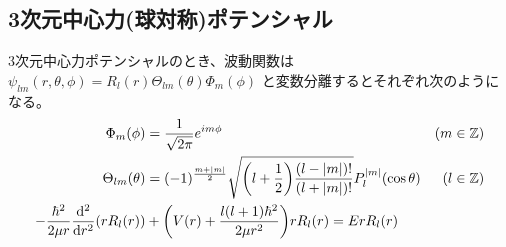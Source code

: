 \documentclass[uplatex,dvipdfmx,a4paper,11pt]{jlreq}
\newcommand{\ZZ}{\mathbb{Z}}
\numberwithin{equation}{section}
\theoremstyle{definition}
\begin{document}
\subsection{3次元中心力(球対称)ポテンシャル}
\begin{proposition}
  3次元中心力ポテンシャルのとき、波動関数は $\psi_{lm}(r, \theta, \phi) = R_l(r)\Theta_{lm}(\theta)\Phi_m(\phi)$ と変数分離するとそれぞれ次のようになる。
  \begin{align}
    \Phi_m(\phi)                               & = \frac{1}{\sqrt{2\pi}}e^{im\phi}                                                                        & (m\in\ZZ) \\
    \Theta_{lm}(\theta)                        & = (-1)^{\frac{m + |m|}{2}}\sqrt{\qty(l + \frac{1}{2})\frac{(l - |m|)!}{(l + |m|)!}}P_l^{|m|}(\cos\theta) & (l\in\ZZ) \\
    - \frac{\hbar^2}{2\mu r}\dv[2]{r}(rR_l(r)) & + \qty(V(r) + \frac{l(l+1)\hbar^2}{2\mu r^2})rR_l(r) = ErR_l(r)
  \end{align}
\end{proposition}
\end{document}
